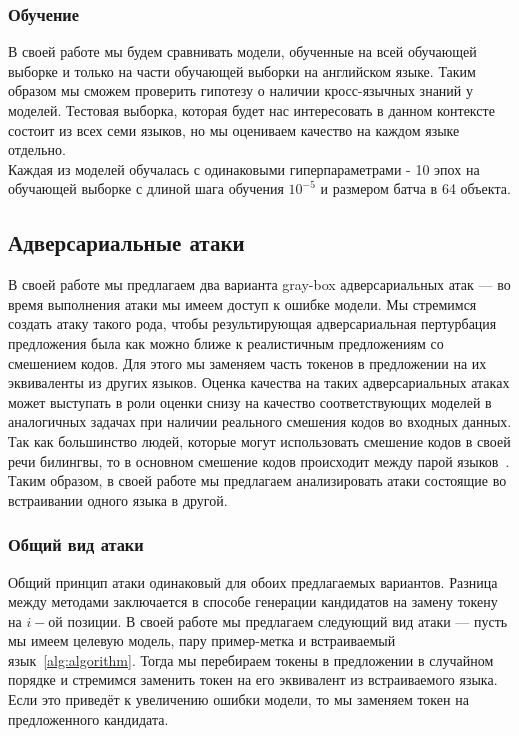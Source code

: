 \subsubsection{Обучение}
В своей работе мы будем сравнивать модели, обученные на всей обучающей выборке и только на части обучающей выборки на английском языке.
Таким образом мы сможем проверить гипотезу о наличии кросс-язычных знаний у моделей.
Тестовая выборка, которая будет нас интересовать в данном контексте состоит из всех семи языков, но мы оцениваем качество на каждом языке отдельно. \\
Каждая из моделей обучалась с одинаковыми гиперпараметрами - 10 эпох на обучающей выборке с длиной шага обучения $10^{-5}$ и размером батча в 64 объекта.

\subsection{Адверсариальные атаки}
В своей работе мы предлагаем два варианта gray-box адверсариальных атак — во время выполнения атаки мы имеем доступ к ошибке модели.
Мы стремимся создать атаку такого рода, чтобы результирующая адверсариальная пертурбация предложения была как можно ближе к реалистичным предложениям со смешением кодов.
Для этого мы заменяем часть токенов в предложении на их эквиваленты из других языков.
Оценка качества на таких адверсариальных атаках может выступать в роли оценки снизу на качество соответствующих моделей в аналогичных задачах при наличии реального смешения кодов во входных данных. \\
Так как большинство людей, которые могут использовать смешение кодов в своей речи билингвы, то в основном смешение кодов происходит между парой языков~\cite{bilinguals}.
Таким образом, в своей работе мы предлагаем анализировать атаки состоящие во встраивании одного языка в другой.

\subsubsection{Общий вид атаки}
Общий принцип атаки одинаковый для обоих предлагаемых вариантов.
Разница между методами заключается в способе генерации кандидатов на замену токену на $i-$ой позиции.
В своей работе мы предлагаем следующий вид атаки — пусть мы имеем целевую модель, пару пример-метка и встраиваемый язык~\eqref{alg:algorithm}.
Тогда мы перебираем токены в предложении в случайном порядке и стремимся заменить токен на его эквивалент из встраиваемого языка.
Если это приведёт к увеличению ошибки модели, то мы заменяем токен на предложенного кандидата.

